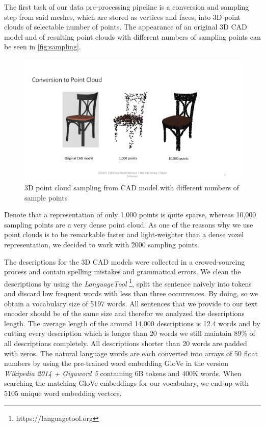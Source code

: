 \documentclass[10pt,twocolumn,letterpaper]{article}
\begin{document}
The first task of our data pre-processing pipeline is a conversion and sampling step from said meshes, which are stored as vertices and faces, into 3D point clouds of selectable number of points. The appearance of an original 3D CAD model and of resulting point clouds with different numbers of sampling points can be seen in \autoref{fig:sampling}.
\begin{figure}[t]%
	\centering
	\includegraphics[width=0.8\linewidth]{fig2.pdf}
	\caption[]{3D point cloud sampling from CAD model with different numbers of sample points}
	\label{fig:sampling}
\end{figure}
Denote that a representation of only 1,000 points is quite sparse, whereas 10,000 sampling points are a very dense point cloud. As one of the reasons why we use point clouds is to be remarkable faster and light-weighter than a dense voxel representation, we decided to work with 2000 sampling points. 

The descriptions for the 3D CAD models were collected in a crowed-sourcing process and contain spelling mistakes and grammatical errors. We clean the descriptions by using the \textit{LanguageTool} \footnote{https://languagetool.org}, split the sentence naively into tokens and discard low frequent words with less than three occurrences. By doing, so we obtain a vocabulary size of 5197 words. All sentences that we provide to our text encoder should be of the same size and therefor we analyzed the descriptions length. The average length of the around 14,000 descriptions is 12.4 words and by cutting every description which is longer than 20 words we still maintain 89\% of all descriptions completely. All descriptions shorter than 20 words are padded with zeros. The natural language words are each converted into arrays of 50 float numbers by using the pre-trained word embedding GloVe \cite{pennington2014glove} in the version \textit{Wikipedia 2014 + Gigaword 5} containing 6B tokens and 400K words. When searching the matching GloVe embeddings for our vocabulary, we end up with 5105 unique word embedding vectors.
\end{document}
